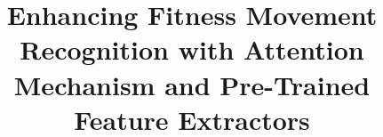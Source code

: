 \documentclass[conference]{IEEEtran}
\begin{document}
\title{Enhancing Fitness Movement Recognition with Attention Mechanism and Pre-Trained Feature Extractors}
% 

\end{document}
